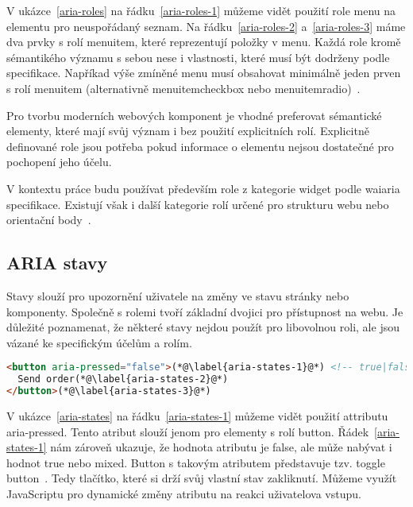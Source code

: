 V ukázce~\ref{aria-roles} na řádku~\ref{aria-roles-1} můžeme vidět použití role menu na elementu pro neuspořádaný seznam.
Na řádku~\ref{aria-roles-2} a~\ref{aria-roles-3} máme dva prvky s rolí menuitem, které reprezentují položky v menu.
Každá role kromě sémantikého významu s sebou nese i vlastnosti, které musí být dodrženy podle specifikace.
Napříkad výše zmíněné menu musí obsahovat minimálně jeden prven s rolí menuitem (alternativně menuitemcheckbox nebo menuitemradio)~\cite{wai-required-owned-elements,wai-standard-guidelines-required-owned-elements}.

Pro tvorbu moderních webových komponent je vhodné preferovat sémantické elementy, které mají svůj význam i bez použití explicitních rolí.
Explicitně definované role jsou potřeba pokud informace o elementu nejsou dostatečné pro pochopení jeho účelu.

V kontextu práce budu používat především role z kategorie widget podle \gls{waiaria} specifikace.
Existují však i další kategorie rolí určené pro strukturu webu nebo orientační body~\cite{wai-catorization-of-roles}.

\subsection{ARIA stavy}

Stavy slouží pro upozornění uživatele na změny ve stavu stránky nebo komponenty.
Společně s rolemi tvoří základní dvojici pro přístupnost na webu.
Je důležité poznamenat, že některé stavy nejdou použít pro libovolnou roli, ale jsou vázané ke specifickým účelům a rolím.

\begin{lstlisting}[caption={Aria stavové atributy}, label={aria-states}, language=html]
<button aria-pressed="false">(*@\label{aria-states-1}@*) <!-- true|false|mixed -->
  Send order(*@\label{aria-states-2}@*)
</button>(*@\label{aria-states-3}@*)
\end{lstlisting}

V ukázce~\ref{aria-states} na řádku~\ref{aria-states-1} můžeme vidět použití attributu aria-pressed.
Tento atribut slouží jenom pro elementy s rolí button.
Řádek~\ref{aria-states-1} nám zároveň ukazuje, že hodnota atributu je false, ale může nabývat i hodnot true nebo mixed.
Button s takovým atributem představuje tzv. toggle button~\cite{mdn-aria-pressed}. Tedy tlačítko, které si drží svůj vlastní stav zakliknutí.
Můžeme využít JavaScriptu pro dynamické změny atributu na reakci uživatelova vstupu.


